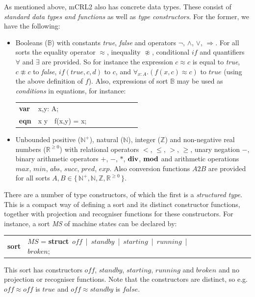\documentclass[a4paper,fleqn]{article}
\makeatletter
\newcommand{\frm}[1]{\mbox{\ensuremath{#1}}}
\newcommand{\f}[1]{\ensuremath{\mathit{#1}}}
\newcommand{\set}[1]{\ensuremath{\{\,#1\,\}}}
\newcommand{\bool}{\ensuremath{\mathbb{B}}}
\newcommand{\true}{\ensuremath{\f{true}}}
\newcommand{\false}{\ensuremath{\f{false}}}
\newcommand{\limp}{\ensuremath{\Rightarrow}}
\newcommand{\nat}{\ensuremath{\mathbb{N}}}
\newcommand{\pos}{\ensuremath{\nat^{+}}}
\newcommand{\tint}{\ensuremath{\mathbb{Z}}}
\newcommand{\nnreal}{\ensuremath{\mathbb{R}^{\geq 0}}}
\newcommand{\kwstruct}{{\bf struct}}
\newcommand{\kwdiv}{{\bf div}}
\newcommand{\kwmod}{{\bf mod}}
\newenvironment{mcrl2}%
{\par\bigskip\noindent%
 \begin{tabular}{@{}>{\bf}p{2.3em}L@{\ }L@{\ }L@{\ }L@{\ }L@{\ }L@{\ }L@{\ }L}%
}%
{\end{tabular}\bigskip\par%
}
\makeatother
\begin{document}
As mentioned above, mCRL2 also has concrete data types. These
consist of \emph{standard data types and functions} as well as
\emph{type constructors}. For the former, we have the following:
\begin{itemize}
\item Booleans ($\bool$) with constants \emph{true}, \emph{false} and operators
$\lnot$, $\land$, $\lor$, $\limp$. For all sorts the equality operator $\approx$,
inequality $\not\approx$, conditional $\f{if}$ and quantifiers $\forall$ and
$\exists$ are provided. So for instance the
expression \frm{c \approx c} is equal to \emph{true}, \frm{c \not\approx c} to \emph{false},
\frm{\f{if}(\f{true}, c, d)} to $c$, and $\forall_{x:A}.(f(x,c) \approx c)$ to $\true$
(using the above definition of $f$). Also, expressions of sort $\bool$ may be
used as \emph{conditions} in equations, for instance:
\begin{mcrl2}
var  & x,y: A;\\
eqn  & x \approx y\ \to\ f(x,y) = x;\\
\end{mcrl2}
\item Unbounded positive (\pos), natural (\nat), integer ($\tint$) and
non-negative real numbers ($\nnreal$) with relational operators $<$, $\leq$,
$>$, $\geq$, unary negation $-$, binary arithmetic operators $+$, $-$, $*$,
$\kwdiv$, $\kwmod$ and arithmetic operations $\f{max}$, $\f{min}$, $\f{abs}$,
$\f{succ}$, $\f{pred}$, $\f{exp}$. Also conversion functions $\f{A2B}$ are
provided for all sorts $A,B \in \set{\pos,\nat,\tint,\nnreal}$.
\end{itemize}

There are a number of type constructors, of which the first is a \emph{structured
type}. This is a compact way of defining a sort and its distinct constructor
functions, together with projection and recogniser functions for these
constructors.  For instance, a sort \emph{MS} of machine states can be declared
by:
\begin{mcrl2}
sort & \f{MS} = \kwstruct\ \f{off}\ |\ \f{standby}\ |\ \f{starting}\
                              |\ \f{running}\ |\ \f{broken};
\end{mcrl2}

\noindent
This sort has constructors $\f{off}$, $\f{standby}$, $\f{starting}$, $\f{running}$
and $\f{broken}$ and no projection or recogniser functions. Note that the
constructors are distinct, so e.g.\ $\f{off} \approx \f{off}$ is $\true$ and
$\f{off} \approx \f{standby}$ is $\false$.
\end{document}
